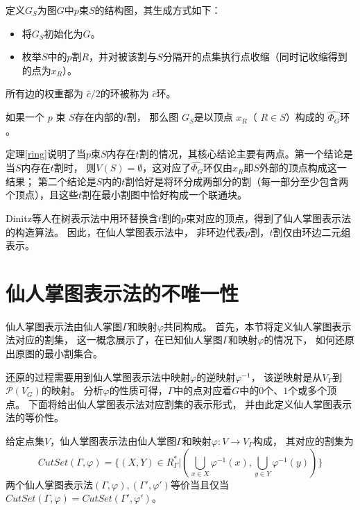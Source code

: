 \begin{definition}[$p$束结构图$G_S$]
定义$G_S$为图$G$中$p$束$S$的结构图，其生成方式如下：
\begin{itemize}
  \item 将$G_S$初始化为$G$。
  \item 枚举$S$中的$p$割$R$，并对被该割与$S$分隔开的点集执行点收缩（同时记收缩得到的点为$x_R$）。
\end{itemize}
\begin{definition}[$\hat c$环]
  所有边的权重都为 $\hat{c}/2$的环被称为 $\hat{c}$环。 
\end{definition}
\end{definition}
\begin{theorem}[含$t$割的$p$束的结构图为环]\cite{dinitz1976structure}
  \label{ring}
  如果一个 $p$ 束 $S$存在内部的$t$割，
  那么图 $G_S$是以顶点 $x_R$（ $R\in S$）构成的 $\hat{\Phi_G}$环 。
\end{theorem}
定理\ref{ring}说明了当$p$束$S$内存在$t$割的情况，其核心结论主要有两点。第一个结论是当$S$内存在$t$割时，
则$V(S)=\emptyset$，这对应了$\hat{\Phi_G}$环仅由$x_R$即$S$外部的顶点构成这一结果；
第二个结论是$S$内的$t$割恰好是将环分成两部分的割（每一部分至少包含两个顶点），且这些$t$割在最小割图中恰好构成一个联通块。

Dinitz等人在树表示法中用环替换含$t$割的$p$束对应的顶点，得到了仙人掌图表示法的构造算法。
因此，在仙人掌图表示法中，
非环边代表$p$割，$t$割仅由环边二元组表示。



\section{仙人掌图表示法的不唯一性}

仙人掌图表示法由仙人掌图$\Gamma$和映射$\varphi$共同构成。
首先，本节将定义仙人掌图表示法对应的割集，
这一概念展示了，在已知仙人掌图$\Gamma$和映射$\varphi$的情况下，
如何还原出原图的最小割集合。

还原的过程需要用到仙人掌图表示法中映射$\varphi$的逆映射$\varphi^{-1}$，
该逆映射是从$V_\Gamma$到$\mathcal{P}(V_G)$的映射。
分析$\varphi$的性质可得，$\Gamma$中的点对应着$G$中的$0$个、$1$个或多个顶点。
下面将给出仙人掌图表示法对应割集的表示形式，
并由此定义仙人掌图表示法的等价性。

\begin{definition}
  \label{cactusequal}
  给定点集$V$，仙人掌图表示法由仙人掌图$\Gamma$和映射$\varphi:V\rightarrow V_\Gamma$构成，
  其对应的割集为
  \begin{equation}
    CutSet(\Gamma,\varphi)=\{(X,Y)\in R^*_{\Gamma}|(\bigcup_{x\in X}\varphi^{-1}(x),\bigcup_{y\in Y}\varphi^{-1}(y))\}
  \end{equation}
  两个仙人掌图表示法$(\Gamma,\varphi),(\Gamma',\varphi')$等价当且仅当$CutSet(\Gamma,\varphi)=CutSet(\Gamma',\varphi')$。
\end{definition}

